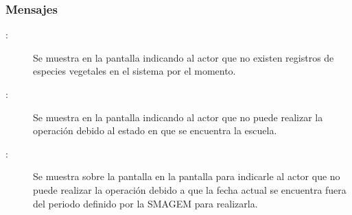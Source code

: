 \subsubsection{Mensajes}

    \begin{description}
	\item [:] Se muestra en la pantalla  indicando al actor que no existen registros de especies vegetales en el sistema por el momento.
	
		\item[:] Se muestra en la pantalla  indicando al actor que no puede realizar la operación debido al estado en que se encuentra la escuela.
	
	\item [:] Se muestra sobre la pantalla en la pantalla  para indicarle al actor que no puede realizar la operación debido a que la fecha actual se encuentra fuera del periodo definido por la SMAGEM para realizarla.
    \end{description}